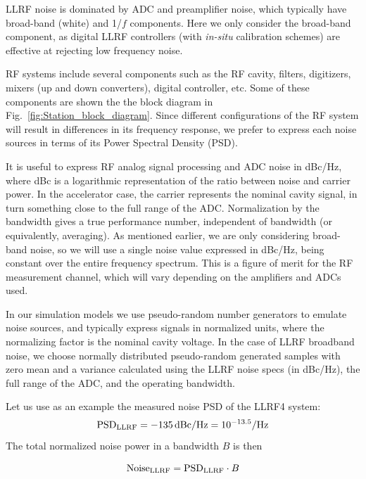 \documentclass[a4paper,12pt]{article}
\begin{document}
LLRF noise is dominated by ADC and preamplifier noise, which typically have broad-band (white) and 1/$f$ components. Here we only consider the broad-band component, as digital LLRF controllers (with {\it in-situ} calibration schemes) are effective at rejecting low frequency noise.

RF systems include several components such as the RF cavity, filters, digitizers, mixers (up and down converters), digital controller, etc. Some of these components are shown the the block diagram in Fig.~\ref{fig:Station_block_diagram}. Since different configurations of the RF system will result in differences in its frequency response, we prefer to express each noise sources in terms of its Power Spectral Density (PSD).

It is useful to express RF analog signal processing and ADC noise in dBc/Hz, where dBc is a logarithmic representation of the ratio between noise and carrier power. In the accelerator case, the carrier represents the nominal cavity signal, in turn something close to the full range of the \hbox{ADC}.  Normalization by the bandwidth gives a true performance number, independent of bandwidth (or equivalently, averaging). As mentioned earlier, we are only considering broad-band noise, so we will use a single noise value expressed in dBc/Hz, being constant over the entire frequency spectrum. This is a figure of merit for the RF measurement channel, which will vary depending on the amplifiers and ADCs used.

In our simulation models we use pseudo-random number generators to emulate noise sources, and typically express signals in normalized units, where the normalizing factor is the nominal cavity voltage. In the case of LLRF broadband noise, we choose normally distributed pseudo-random generated samples with zero mean and a variance calculated using the LLRF noise specs (in dBc/Hz), the full range of the ADC, and the operating bandwidth.

Let us use as an example the measured noise PSD of the LLRF4 system:
\begin{equation}
  \centering {\rm PSD}_{\rm LLRF} = -135\thinspace{\rm dBc/Hz} = 10^{-13.5} {\rm /Hz}
\end{equation}
The total normalized noise power in a bandwidth $B$ is then

\begin{equation}
  \centering {\rm Noise}_{\rm LLRF} ={\rm PSD}_{\rm LLRF}\cdot B
  \label{eq:PSD_to_noise}
\end{equation}
\end{document}
